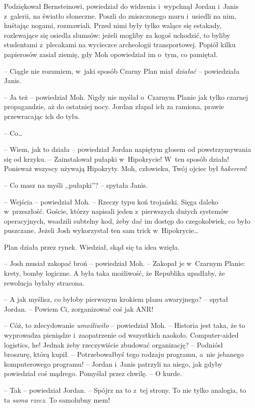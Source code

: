 \documentclass[oneside,polish,11pt,sfheadings]{mwbk}
\begin{document}
Podziękował Bernsteinowi, powiedział do widzenia i~wypchnął Jordan i~Janis z~galerii, na światło słoneczne. Poszli do zniszczonego muru i~usiedli na nim, huśtając nogami, rozmawiali. Przed nimi były tylko
walące się estakady, rozlewające się osiedla slumsów: jeżeli mogliby za
kogoś uchodzić, to byliby studentami z~plecakami na wycieczce
archeologii transportowej. Popiół kilku papierosów zasiał ziemię, gdy
Moh opowiedział im o~tym, co pamiętał.

-- Ciągle nie rozumiem, w~jaki sposób Czarny Plan miał \emph{działać} -- powiedziała Janis.

-- Ja też -- powiedział Moh. Nigdy nie myślał o~Czarnym Planie jak tylko
czarnej propagandzie, aż do ostatniej nocy. Jordan złapał ich za
ramiona, prawie przewracając ich do tyłu.

-- Co\ldots

-- Wiem, jak to działa -- powiedział Jordan napiętym głosem od
powstrzymywania się od krzyku. -- Zainstalował pułapki w~Hipokrycie! W~ten sposób działa! Ponieważ wszyscy używają Hipokryty. Moh, człowieku,
Twój ojciec był \emph{hakerem}!

-- Co masz na myśli ,,pułapki''? -- spytała Janis.

-- Wejścia -- powiedział Moh. -- Rzeczy typu koń trojański. Sięga daleko w~przeszłość. Goście, którzy napisali jeden z~pierwszych dużych systemów
operacyjnych, wsadzili subtelny kod, żeby dać im dostęp do czegokolwiek,
co było puszczane. Jeżeli Josh wykorzystał ten sam trick w~Hipokrycie\ldots

Plan działa przez rynek. Wiedział, skąd się ta idea wzięła.

-- Josh musiał zakopać broń -- powiedział Moh. -- Zakopał je w~Czarnym
Planie: krety, bomby logiczne. A była taka możliwość, że Republika
upadłaby, że rewolucja byłaby stracona.

-- A jak myślisz, co byłoby pierwszym krokiem planu awaryjnego? -- spytał
Jordan. -- Powiem Ci, zorganizować coś jak ANR!

-- Cóż, to zdecydowanie \emph{umożliwiło} -- powiedział Moh. -- Historia
jest taka, że to wyprowadza pieniądze i~zaopatrzenie od wszystkich
naokoło. Computer-aided logistics, he! Jednak żeby rzeczywiście zbudować
organizację? -- Podniósł broszurę, którą kupił. -- Potrzebowałbyś tego
rodzaju programu, a~nie jebanego komputerowego programu! -- Jordan i~Janis patrzyli na niego, jak gdyby powiedział coś mądrego. Pomyślał
przez chwilę. -- O kurde.

-- Tak -- powiedział Jordan. -- Spójrz na to z~tej strony. To nie tylko
analogia, to ta \emph{sama rzecz}. To samolubny mem!
\end{document}
